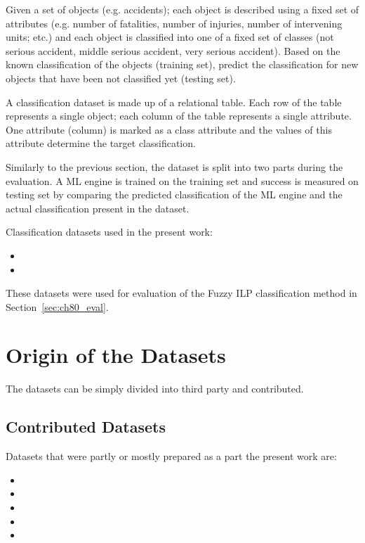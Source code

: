 Given a set of objects (e.g. accidents); each object is described using a fixed set of attributes (e.g. number of fatalities, number of injuries, number of intervening units; etc.) and each object is classified into one of a fixed set of classes (not serious accident, middle serious accident, very serious accident). Based on the known classification of the objects (training set), predict the classification for new objects that have been not classified yet (testing set). 

A classification dataset is made up of a relational table. Each row of the table represents a single object; each column of the table represents a single attribute. One attribute (column) is marked as a class attribute and the values of this attribute determine the target classification. 

Similarly to the previous section, the dataset is split into two parts during the evaluation. A ML engine is trained on the training set and success is measured on testing set by comparing the predicted classification of the ML engine and the actual classification present in the dataset.

Classification datasets used in the present work:
\begin{itemize}
	\item {}
	\item {}
\end{itemize}

These datasets were used for evaluation of the Fuzzy ILP classification method in Section~\ref{sec:ch80_eval}. 




\section{Origin of the Datasets}
The datasets can be simply divided into third party and contributed. 

\subsection{Contributed Datasets}
Datasets that were partly or mostly prepared as a part the present work are:


\begin{itemize}
	\item {}
	\item {}
	\item {}
	\item {}
	\item {}
\end{itemize}

